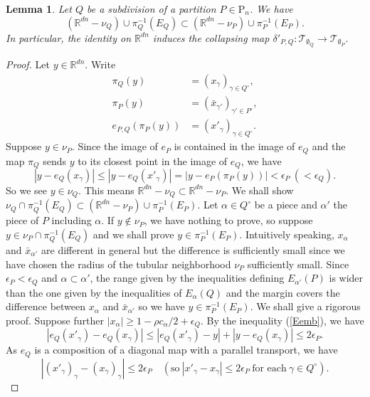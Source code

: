 \documentclass[reqno]{amsart}
\theoremstyle{definition}
\theoremstyle{plain}
\newtheorem{lem}[defi]{Lemma}
\newcommand{\eps}{\epsilon}
\newcommand{\TT}{\mathcal{T}} %
\newcommand{\RR}{\mathbb{R}}
\newcommand{\PP}{\mathrm{P}} %
\begin{document}
\begin{lem}\label{Ldiagonal_bound}
Let $Q$ be a subdivision of a partition $P\in \PP_n$. We have
\[
(\RR^{dn}-\nu_Q)\cup \pi_Q^{-1}(E_Q)\subset (\RR^{dn}-\nu_P)\cup \pi_P^{-1}(E_P).
\]
In particular, the identity on $\RR^{dn}$ induces the collapsing map 
$\delta'_{P,Q}:\TT_{\emptyset_Q}\to \TT_{\emptyset_P}.
$
\end{lem}
\begin{proof}
 Let $y\in \RR^{dn}$.
Write
\[
\begin{split}
\pi_{Q}(y)&=(x_\gamma)_{\gamma\in Q^\circ}, \\
\pi_{P}(y)&=(\bar x_{\gamma'})_{\gamma'\in P^\circ},\\
e_{P,Q}(\pi_P(y))&=(x'_\gamma)_{\gamma\in Q^\circ} .
\end{split}
\] Suppose $y\in \nu_P$.  Since the image of $e_P$ is contained in the image of $e_Q$ and the map $\pi_{Q}$ sends $y$ to its closest point in the image of $e_Q$, we have
\begin{equation}
|y-e_Q(x_\gamma)|\leq |y-e_Q(x'_\gamma)|=|y-e_P(\pi_P(y))|< \eps_P\ (<\eps_Q). \label{Eemb}
\end{equation}
So we see $y\in \nu_Q$. This means $\RR^{dn}-\nu_Q\subset \RR^{dn}-\nu_P$. We shall show $\nu_Q\cap \pi_Q^{-1}(E_Q)\subset (\RR^{dn}-\nu_P)\cup \pi_P^{-1}(E_P)$. Let $\alpha\in Q^\circ$ be a piece and $\alpha'$  the piece of $P$ including $\alpha$. If $y\not\in \nu_P$, we have nothing to prove, so suppose  $y\in \nu_P\cap\pi_Q^{-1}(E_Q)$ and we shall prove $y\in \pi_P^{-1}(E_P)$. Intuitively speaking, $x_\alpha$ and $\bar x_{\alpha'}$ are different in general but the difference is sufficiently small since we have chosen the radius of the tubular neighborhood $\nu_P$ sufficiently small. Since $\eps_P<\eps_Q$ and $\alpha\subset \alpha'$, the range given by the inequalities defining $E_{\alpha'}(P)$ is wider than the one given by the inequalities of $E_\alpha(Q)$ and the margin covers the difference between $x_\alpha$ and $\bar x_{\alpha'}$ so we have $y\in \pi_P^{-1}(E_P)$. We shall give a rigorous proof.  Suppose further $|x_\alpha|\geq 1-\rho c_\alpha/2+\eps_Q$. 
By the inequality (\ref{Eemb}), we have
\[
|e_Q(x'_\gamma)-e_Q(x_\gamma)|\leq |e_Q(x'_\gamma)-y|+|y-e_Q(x_\gamma)|\leq 2\eps_P.
\]
As $e_Q$ is a composition of a diagonal map with a parallel transport, we have
\begin{equation}
|(x'_\gamma)_\gamma-(x_\gamma)_\gamma |\leq 2\eps_P \quad (\text{so} \ |x'_\gamma-x_\gamma|\leq 2\eps_P\ \text{for each}\ \gamma\in Q^\circ). \label{Edifference}

\end{equation}
\end{proof}
\end{document}
